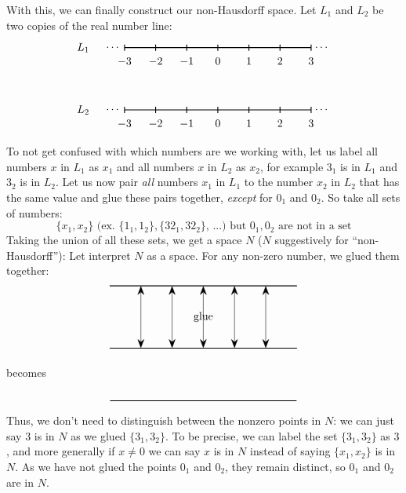 \documentclass{article}
\begin{document}
With this, we can finally construct our non-Hausdorff space. Let
$L_1$ and $L_2$ be two copies of the real number line:
\[
\begin{tikzpicture}
  \draw[thick] (-3,1) -- (3,1) node[left=7cm] {$L_1$};
  \foreach \x in {-3,-2,-1,0,1,2,3} {
    \draw[thick] (\x,0.9) -- (\x,1.1);
    \node[below] at (\x,0.8) {$\x$};
  }
  \node[left] at (-3,1) {$\cdots$};
  \node[right] at (3,1) {$\cdots$};

  \draw[thick] (-3,-1) -- (3,-1) node[left=7cm] {$L_2$};
  \foreach \x in {-3,-2,-1,0,1,2,3} {
    \draw[thick] (\x,-1.1) -- (\x,-0.9);
    \node[below] at (\x,-1.2) {$\x$};
  }
  \node[left] at (-3,-1) {$\cdots$};
  \node[right] at (3,-1) {$\cdots$};
\end{tikzpicture}
\]
To not get confused with which numbers are we working with, let us label all numbers $x$ in $L_1$ as $x_1$ and
all numbers $x$ in $L_2$ as $x_2$, for example $3_1$ is in $L_1$ and $3_2$ is in $L_2$. Let us now pair
\emph{all} numbers $x_1$ in $L_1$ to the number $x_2$ in $L_2$ that has the same value and glue these pairs
together, \emph{except} for $0_1$ and $0_2$. So take all sets of numbers:
\[
  \{x_1, x_2\}\text{ (ex. $\{1_1,1_2\}, \{32_1, 32_2\}$, ...) but $0_1,0_2$ are not in a set}
\]
Taking the union of all these sets, we get a space $N$ ($N$ suggestively for ``non-Hausdorff''): Let interpret
$N$ as a space. For any non-zero number, we glued them together:
\[
\begin{tikzpicture}
\draw[thick] (0,0) -- (6,0);
\draw[thick] (0,2) -- (6,2);

\draw[{Stealth[length=3mm]}-{Stealth[length=3mm]}] (1,0) -- (1,2);
\draw[{Stealth[length=3mm]}-{Stealth[length=3mm]}] (2,0) -- (2,2);
\draw[{Stealth[length=3mm]}-{Stealth[length=3mm]}] (3,0) -- (3,2);
\draw[{Stealth[length=3mm]}-{Stealth[length=3mm]}] (4,0) -- (4,2);
\draw[{Stealth[length=3mm]}-{Stealth[length=3mm]}] (5,0) -- (5,2);

\node at (3,1) {glue};

\end{tikzpicture}
\]
\begin{center}
  becomes
\end{center}
\[
\begin{tikzpicture}

\draw[thick] (-2,0) -- (4,0);
\end{tikzpicture}
\]
Thus, we don't need to distinguish between the nonzero points in $N$: we can just say $3$ is in $N$ as we glued
$\{3_1, 3_2\}$. To be precise, we can label the set $\{3_1, 3_2\}$ as $3$, and more generally if $x \ne 0$ we
can say $x$ is in $N$ instead of saying $\{x_1, x_2\}$ is in $N$. As we have
not glued the points $0_1$ and $0_2$, they remain distinct, so $0_1$ and $0_2$ are in $N$.
\end{document}
